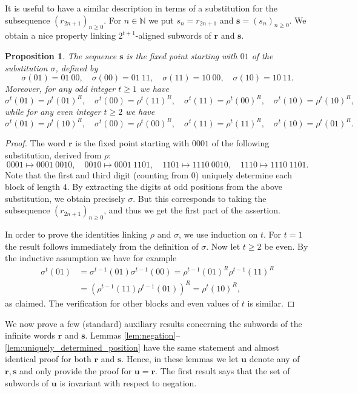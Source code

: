 \documentclass[a4paper,11pt]{amsart}
\newtheorem{prop}[thm]{Proposition}
\theoremstyle{definition}
\newcommand{\N}{\mathbb{N}}
\begin{document}
It is useful to have a similar description in terms of a substitution for the subsequence $(r_{2n+1})_{n \geq 0}$. For $n \in \N$ we put $s_n = r_{2n+1}$ and $\mathbf{s} = (s_n)_{n \geq 0}$. We obtain a nice property linking $2^{t+1}$-aligned subwords of $\mathbf{r}$ and $\mathbf{s}$.

\begin{prop} \label{prop:interesting_property}
The sequence $\mathbf{s}$ is the fixed point starting with $01$ of the substitution $\sigma$, defined by
$$ \sigma(01) = 01 \: 00, \quad \sigma(00) = 01 \: 11, \quad  \sigma(11) = 10 \: 00, \quad \sigma(10) = 10 \: 11.$$
Moreover, for any odd integer $t \geq 1$ we have
$$ \sigma^t(01) = \rho^t(01)^R, \quad \sigma^t(00) = \rho^t(11)^R, \quad \sigma^t(11) = \rho^t(00)^R, \quad  \sigma^t(10) = \rho^t(10)^R,  $$
while for any even integer $t \geq 2$ we have
$$ \sigma^t(01) = \rho^t(10)^R, \quad \sigma^t(00) = \rho^t(00)^R, \quad \sigma^t(11) = \rho^t(11)^R, \quad  \sigma^t(10) = \rho^t(01)^R.  $$
\end{prop}
\begin{proof}
The word $\mathbf{r}$ is the fixed point starting with $0001$ of the following substitution, derived from $\rho$:
$$ 0001 \mapsto 0001 \: 0010, \quad 0010 \mapsto 0001 \: 1101, \quad  1101 \mapsto 1110 \: 0010, \quad 1110 \mapsto 1110 \: 1101.$$
Note that the first and third digit (counting from $0$) uniquely determine each block of length $4$. By extracting the digits at odd positions from the above substitution, we obtain precisely $\sigma$. But this corresponds to taking the subsequence $(r_{2n+1})_{n \geq 0}$, and thus we get the first part of the assertion.

In order to prove the identities linking $\rho$ and $\sigma$, we use induction on $t$. For $t = 1$ the result follows immediately from the definition of $\sigma$. Now let $t \geq 2$ be even. By the inductive assumption we have for example
\begin{align*} 
\sigma^t(01) &= \sigma^{t-1}(01) \sigma^{t-1}(00) = \rho^{t-1}(01)^R \rho^{t-1}(11)^R \\
 &= (\rho^{t-1}(11) \rho^{t-1}(01) )^R = \rho^t(10)^R,
\end{align*}
as claimed. The verification for other blocks and even values of $t$ is similar. 
\end{proof}

We now prove a few (standard) auxiliary results concerning the subwords of the infinite words $\mathbf{r}$ and $\mathbf{s}$. Lemmas \ref{lem:negation}--\ref{lem:uniquely_determined_position} have the same statement and almost identical proof for both $\mathbf{r}$ and $\mathbf{s}$. Hence, in these lemmas we let $\mathbf{u}$ denote any of $\mathbf{r},\mathbf{s}$ and only provide the proof for $\mathbf{u} = \mathbf{r}$.  The first result says that the set of subwords of $\mathbf{u}$ is invariant with respect to negation.
\end{document}
